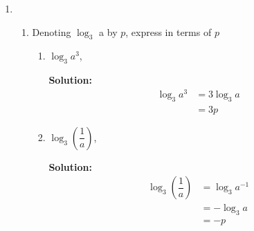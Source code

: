 \documentclass{report}
\newcommand{\sol}{\vspace{0.2cm}\textbf{Solution:}\vspace{0.2cm}}
\begin{document}
\begin{multicols*}{2}
\begin{enumerate}[leftmargin=*]
\begin{enumerate}
                        \newpage
                  \item Given that $5 \log _p 6-\log _p 96=4$, find the value of $p$.

                        \sol{}
                        \begin{align*}
                            5 \log_p 6 - \log_p 96 & = 4   \\
                            \log_p 6^5 - \log_p 96 & = 4   \\
                            \log_p \dfrac{6^5}{96} & = 4   \\
                            \dfrac{7776}{96}       & = p^4 \\
                            p^4                    & = 81  \\
                            p                      & = 3
                        \end{align*}
              \end{enumerate}

        \item \begin{enumerate}
                  \item Denoting $\log _3$ a by $p$, express in terms of $p$
                        \begin{enumerate}
                            \item $\log _3 a^3$,

                                  \sol{}
                                  \begin{align*}
                                      \log_3 a^3 & = 3 \log_3 a \\
                                                 & = 3p
                                  \end{align*}

                            \item $\log _3\left(\dfrac{1}{a}\right)$,

                                  \sol{}
                                  \begin{align*}
                                      \log_3 \left(\dfrac{1}{a}\right) & = \log_3 a^{-1} \\
                                                                       & = -\log_3 a     \\
                                                                       & = -p
                                  \end{align*}


\end{enumerate}
\end{enumerate}
\end{enumerate}
\end{multicols*}
\end{document}

